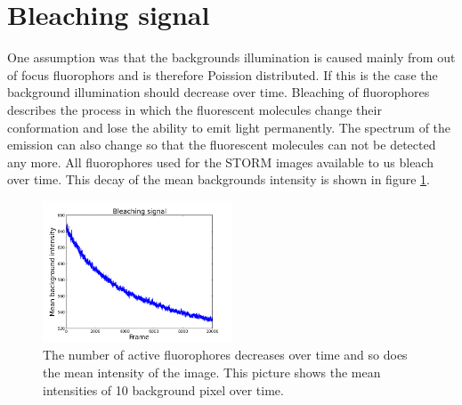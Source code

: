 \section{Bleaching signal}
One assumption was that the backgrounds illumination is caused mainly from out of focus fluorophors and is therefore Poission distributed. If this is the case the background illumination should decrease over time. Bleaching of fluorophores describes the process in which the fluorescent molecules change their conformation and lose the ability to emit light permanently. The spectrum of the emission can also change so that the fluorescent molecules can not be detected any more. All fluorophores used for the STORM images available to us bleach over time. This decay of the mean backgrounds intensity is shown in figure \ref{bleaching}.

\begin{figure}
\centering
\includegraphics[width = 0.5\textwidth]{pictures/bleaching.png}
	\caption{The number of active fluorophores decreases over time and so does the mean intensity of the image. This picture shows the mean intensities of 10 background pixel over time. }
	\label{bleaching}
\end{figure}